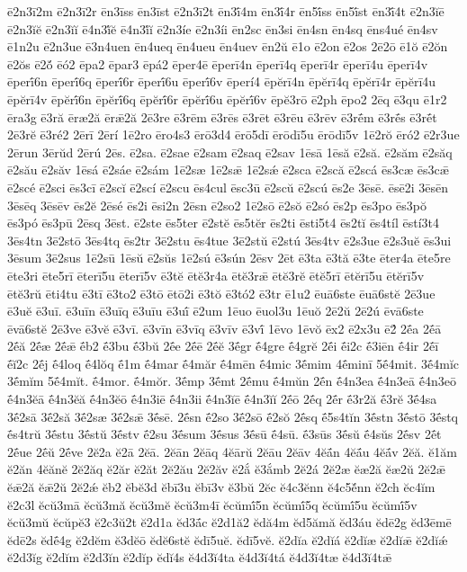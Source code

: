 {ē2n3ī2m
ē2n3ī2r
ēn3īss
ēn3īst
ē2n3ī2t
ēn3ī́4m
ēn3ī́4r
ēn5ī́ss
ēn5ī́st
ēn3ī́4t
ē2n3ĭē
ē2n3ĭĕ
ē2n3ĭĭ
ē4n3ĭ́ĕ
ē4n3ĭ́ĭ
ē2n3íe
ē2n3íi
ēn2sc
ēn3si
ēn4sn
ēn4sq
ēns4ué
ēn4sv
ē1n2u
ē2n3ue
ē3n4uen
ēn4ueq
ēn4ueu
ēn4uev
ēn2ŭ
ē1o
ē2on
ē2os
2ē2ō
ē1ŏ
ē2ŏn
ē2ŏs
ē2ŏ́
ēó2
ēpa2
ēpar3
ēpá2
ēper4ē
ēperī4n
ēperī4q
ēperī4r
ēperī4u
ēperī4v
ēperī́6n
ēperī́6q
ēperī́6r
ēperī́6u
ēperī́6v
ēperí4
ēpĕrī4n
ēpĕrī4q
ēpĕrī4r
ēpĕrī4u
ēpĕrī4v
ēpĕrī́6n
ēpĕrī́6q
ēpĕrī́6r
ēpĕrī́6u
ēpĕrī́6v
ēpĕ3rō
ē2ph
ēpo2
2ēq
ē3qu
ē1r2
ēra3g
ē3ră
ēræ2ă
ērǣ2ă
2ē3re
ē3rēm
ē3rēs
ē3rēt
ē3rēu
ē3rēv
ē3rḗm
ē3rḗs
ē3rḗt
2ē3rĕ
ē3ré2
2ērī
2ērí
1ē2ro
ēro4s3
ērō3d4
ērō5dī
ērōdī5u
ērōdī5v
1ē2rŏ
ēró2
ē2r3ue
2ērun
3ērŭd
2ērú
2ēs.
ē2sa.
ē2sae
ē2sam
ē2saq
ē2sav
1ēsā
1ēsă
ē2să.
ē2săm
ē2săq
ē2său
ē2săv
1ēsá
ē2sáe
ē2sám
1ē2sæ
1ē2sǣ
1ē2sǽ
ē2sca
ē2scă
ē2scá
ēs3cæ
ēs3cǣ
ē2scé
ē2sci
ēs3cī
ē2scĭ
ē2scí
ē2scu
ēs4cul
ēsc3ū
ē2scŭ
ē2scú
ēs2e
3ēsē.
ēsē2i
3ēsēn
3ēsēq
3ēsēv
ēs2ĕ
2ēsé
ēs2i
ēsi2n
2ēsn
ē2so2
1ē2sō
ē2sŏ
ē2só
ēs2p
ēs3po
ēs3pŏ
ēs3pó
ēs3pū
2ēsq
3ēst.
ē2ste
ēs5ter
ē2stĕ
ēs5tĕr
ēs2ti
ēsti5t4
ēs2tĭ
ēs4tíl
ēstí3t4
3ēs4tn
3ē2stō
3ēs4tq
ēs2tr
3ē2stu
ēs4tue
3ē2stŭ
ē2stú
3ēs4tv
ē2s3ue
ē2s3uĕ
ēs3ui
3ēsum
3ē2sus
1ē2sū
1ēsŭ
ē2sŭs
1ē2sú
ē3sún
2ēsv
2ēt
ē3ta
ē3tă
ē3te
ēter4a
ēte5re
ēte3ri
ēte5rī
ēterī5u
ēterī5v
ē3tĕ
ētĕ3r4a
ētĕ3rǣ
ētĕ3rĕ
ētĕ5rī
ētĕrī5u
ētĕrī5v
ētĕ3rŭ
ēti4tu
ē3tī
ē3to2
ē3tō
ētō2i
ē3tŏ
ē3tó2
ē3tr
ē1u2
ēuā6ste
ēuā6stĕ
2ē3ue
ē3uĕ
ē3uī.
ē3uīn
ē3uīq
ē3uīu
ē3uī́
ē2um
1ēuo
ēuol3u
1ēuŏ
2ē2ŭ
2ē2ú
ēvā6ste
ēvā6stĕ
2ē3ve
ē3vĕ
ē3vī.
ē3vīn
ē3vīq
ē3vīv
ē3vī́
1ēvo
1ēvŏ
ēx2
ē2x3u
ē2́
2ḗa
2ḗā
2ḗă
2ḗæ
2ḗǣ
ḗb2
ḗ3bu
ḗ3bŭ
2ḗe
2ḗē
2ḗĕ
3ḗgr
ḗ4gre
ḗ4grĕ
2ḗi
ḗi2c
ḗ3iēn
ḗ4ir
2ḗī
ḗĭ2c
2ḗj
ḗ4loq
ḗ4lŏq
ḗ1m
ḗ4mar
ḗ4măr
ḗ4mēn
ḗ4mic
3ḗmim
4ḗminī
5ḗ4mit.
3ḗ4mĭc
3ḗmĭm
5ḗ4mĭt.
ḗ4mor.
ḗ4mŏr.
3ḗmp
3ḗmt
2ḗmu
ḗ4mŭn
2ḗn
ḗ4n3ea
ḗ4n3eā
ḗ4n3eō
ḗ4n3ĕā
ḗ4n3ĕă
ḗ4n3ĕō
ḗ4n3iē
ḗ4n3ii
ḗ4n3ĭē
ḗ4n3ĭĭ
2ḗō
2ḗq
2ḗr
ḗ3r2ă
ḗ3rĕ
3ḗ4sa
3ḗ2sā
3ḗ2să
3ḗ2sæ
3ḗ2sǣ
3ḗsē.
2ḗsn
ḗ2so
3ḗ2sō
ḗ2sŏ
2ḗsq
ḗ5s4tĭn
3ḗstn
3ḗstō
3ḗstq
ḗs4trŭ
3ḗstu
3ḗstŭ
3ḗstv
ḗ2su
3ḗsum
3ḗsus
3ḗsū
ḗ4sū.
ḗ3sūs
3ḗsŭ
ḗ4sŭs
2ḗsv
2ḗt
2ḗue
2ḗŭ
2ḗve
2ĕ2a
ĕ2ā
2ĕā.
2ĕān
2ĕāq
4ĕārŭ
2ĕāu
2ĕāv
4ĕā́n
4ĕā́u
4ĕā́v
2ĕă.
ĕ1ăm
ĕ2ăn
4ĕănĕ
2ĕ2ăq
ĕ2ăr
ĕ2ăt
2ĕ2ău
2ĕ2ăv
ĕ2ắ
ĕ3ắmb
2ĕ2á
2ĕ2æ
ĕæ2ă
ĕæ2ŭ
2ĕ2ǣ
ĕǣ2ă
ĕǣ2ŭ
2ĕ2ǽ
ĕb2
ĕbĕ3d
ĕbī3u
ĕbī3v
ĕ3bŭ
2ĕc
ĕ4c3ĕnn
ĕ4c5ĕ́nn
ĕ2ch
ĕc4ĭm
ĕ2c3l
ĕcŭ3mā
ĕcŭ3mă
ĕcŭ3mĕ
ĕcŭ3m4ī
ĕcŭmī́5n
ĕcŭmī́5q
ĕcŭmī́5u
ĕcŭmī́5v
ĕcŭ3mŭ
ĕcŭpĕ3
ĕ2c3ŭ2t
ĕ2d1a
ĕd3ā́c
ĕ2d1ă2
ĕdă4m
ĕd5ămă
ĕd3áu
ĕdē2g
ĕd3ēmē
ĕdē2s
ĕdḗ4g
ĕ2dĕm
ĕ3dĕō
ĕdĕ6stĕ
ĕdī5uĕ.
ĕdī5vĕ.
ĕ2dĭa
ĕ2dĭá
ĕ2dĭæ
ĕ2dĭǣ
ĕ2dĭǽ
ĕ2d3ĭg
ĕ2dĭm
ĕ2d3ĭn
ĕ2dĭp
ĕdĭ4s
ĕ4d3ĭ4ta
ĕ4d3ĭ4tá
ĕ4d3ĭ4tæ
ĕ4d3ĭ4tǣ
}
